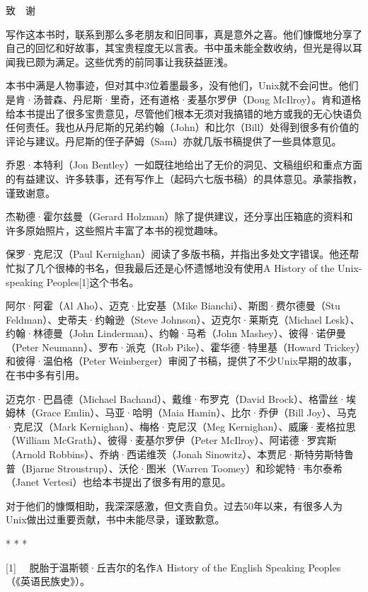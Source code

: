 \documentclass[a4paper,12pt,UTF8,twoside]{ctexbook}
\begin{document}
致　谢


写作这本书时，联系到那么多老朋友和旧同事，真是意外之喜。他们慷慨地分享了自己的回忆和好故事，其宝贵程度无以言表。书中虽未能全数收纳，但光是得以耳闻我已颇为满足。这些优秀的前同事让我获益匪浅。

本书中满是人物事迹，但对其中3位着墨最多，没有他们，Unix就不会问世。他们是肯·汤普森、丹尼斯·里奇，还有道格·麦基尔罗伊（Doug McIlroy）。肯和道格给本书提出了很多宝贵意见，尽管他们根本无须对我搞错的地方或我的无心快语负任何责任。我也从丹尼斯的兄弟约翰（John）和比尔（Bill）处得到很多有价值的评论与建议。丹尼斯的侄子萨姆（Sam）亦就几版书稿提供了一些具体意见。

乔恩·本特利（Jon Bentley）一如既往地给出了无价的洞见、文稿组织和重点方面的有益建议、许多轶事，还有写作上（起码六七版书稿）的具体意见。承蒙指教，谨致谢意。

杰勒德·霍尔兹曼（Gerard Holzman）除了提供建议，还分享出压箱底的资料和许多原始照片，这些照片丰富了本书的视觉趣味。

保罗·克尼汉（Paul Kernighan）阅读了多版书稿，并指出多处文字错误。他还帮忙拟了几个很棒的书名，但我最后还是心怀遗憾地没有使用A History of the Unix-speaking Peoples[1]这个书名。

阿尔·阿霍（Al Aho）、迈克·比安基（Mike Bianchi）、斯图·费尔德曼（Stu Feldman）、史蒂夫·约翰逊（Steve Johnson）、迈克尔·莱斯克（Michael Lesk）、约翰·林德曼（John Linderman）、约翰·马希（John Mashey）、彼得·诺伊曼（Peter Neumann）、罗布·派克（Rob Pike）、霍华德·特里基（Howard Trickey）和彼得·温伯格（Peter Weinberger）审阅了书稿，提供了不少Unix早期的故事，在书中多有引用。

迈克尔·巴昌德（Michael Bachand）、戴维·布罗克（David Brock）、格雷丝·埃姆林（Grace Emlin）、马亚·哈明（Maia Hamin）、比尔·乔伊（Bill Joy）、马克·克尼汉（Mark Kernighan）、梅格·克尼汉（Meg Kernighan）、威廉·麦格拉思（William McGrath）、彼得·麦基尔罗伊（Peter McIlroy）、阿诺德·罗宾斯（Arnold Robbins）、乔纳·西诺维茨（Jonah Sinowitz）、本贾尼·斯特劳斯特鲁普（Bjarne Stroustrup）、沃伦·图米（Warren Toomey）和珍妮特·韦尔泰希（Janet Vertesi）也给本书提出了很多有用的意见。

对于他们的慷慨相助，我深深感激，但文责自负。过去50年以来，有很多人为Unix做出过重要贡献，书中未能尽录，谨致歉意。



* * *



[1] 　脱胎于温斯顿·丘吉尔的名作A History of the English Speaking Peoples（《英语民族史》）。
\end{document}
